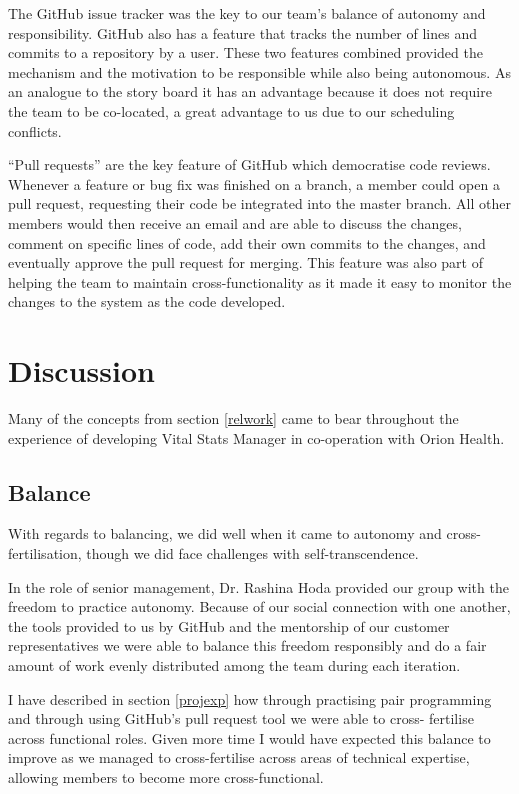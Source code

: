 \documentclass[conference]{IEEEtran}
\begin{document}
The GitHub issue tracker was the key to our team's balance of autonomy and
responsibility. GitHub also has a feature that tracks the number of lines and
commits to a repository by a user. These two features combined provided the
mechanism and the motivation to be responsible while also being autonomous. As
an analogue to the story board it has an advantage because it does not require
the team to be co-located, a great advantage to us due to our scheduling
conflicts.

``Pull requests'' are the key feature of GitHub which democratise code reviews.
Whenever a feature or bug fix was finished on a branch, a member could open a
pull request, requesting their code be integrated into the master branch. All
other members would then receive an email and are able to discuss the changes,
comment on specific lines of code, add their own commits to the changes, and
eventually approve the pull request for merging. This feature was also part of
helping the team to maintain cross-functionality as it made it easy to monitor
the changes to the system as the code developed.


\section{Discussion}

Many of the concepts from section \ref{relwork} came to bear throughout the
experience of developing Vital Stats Manager in co-operation with Orion Health.

\subsection{Balance}

With regards to balancing, we did well when it came to autonomy and cross-
fertilisation, though we did face challenges with self-transcendence.

In the role of senior management, Dr. Rashina Hoda provided our group with the
freedom to practice autonomy. Because of our social connection with one another,
the tools provided to us by GitHub and the mentorship of our customer
representatives we were able to balance this freedom responsibly and do a fair
amount of work evenly distributed among the team during each iteration.

I have described in section \ref{projexp} how through practising pair
programming and through using GitHub's pull request tool we were able to cross-
fertilise across functional roles. Given more time I would have expected this
balance to improve as we managed to cross-fertilise across areas of technical
expertise, allowing members to become more cross-functional.
\end{document}
